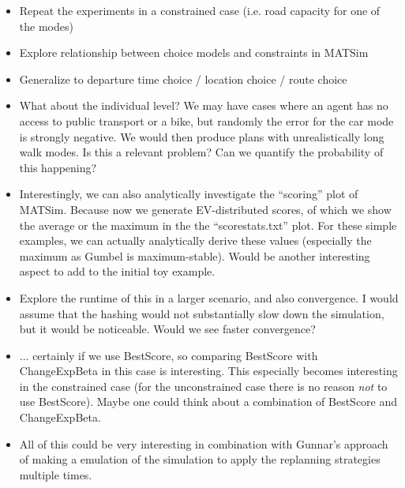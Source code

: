 \documentclass[a4paper]{article}
\begin{document}
\begin{itemize}
  \item Repeat the experiments in a constrained case (i.e. road capacity for one of the modes)
  \item Explore relationship between choice models and constraints in MATSim
  \item Generalize to departure time choice / location choice / route choice
  \item What about the individual level? We may have cases where an agent has no
  access to public transport or a bike, but randomly the error for the car mode
  is strongly negative. We would then produce plans with unrealistically long
  walk modes. Is this a relevant problem? Can we quantify the probability of
  this happening?
  \item Interestingly, we can also analytically investigate the ``scoring''
  plot of MATSim. Because now we generate EV-distributed scores, of which we
  show the average or the maximum in the the ``scorestats.txt'' plot. For these
  simple examples, we can actually analytically derive these values (especially
  the maximum as Gumbel is maximum-stable). Would be another interesting aspect
  to add to the initial toy example.
  \item Explore the runtime of this in a larger scenario, and also convergence.
  I would assume that the hashing would not substantially slow down the simulation,
  but it would be noticeable. Would we see faster convergence?
  \item ... certainly if we use BestScore, so comparing BestScore with ChangeExpBeta
  in this case is interesting. This especially becomes interesting in the
  constrained case (for the unconstrained case there is no reason \textit{not}
  to use BestScore). Maybe one could think about a combination of BestScore
  and ChangeExpBeta.
  \item All of this could be very interesting in combination with Gunnar's
  approach of making a emulation of the simulation to apply the replanning
  strategies multiple times.
\end{itemize}
\end{document}
